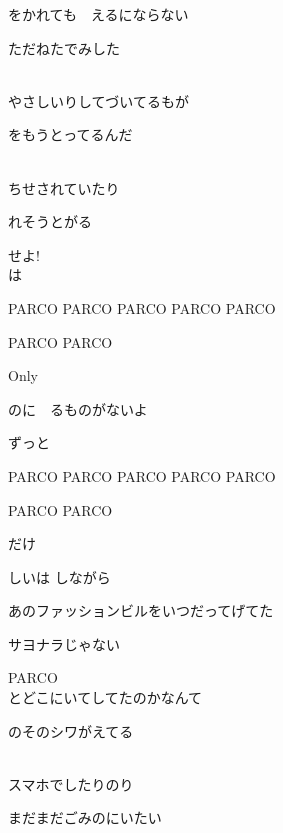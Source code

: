 をかれても　えるにならない

ただねたでみした

\\

やさしいりしてづいてるもが

をもうとってるんだ

\\

ちせされていたり

れそうとがる

せよ!
\\

は

PARCO PARCO PARCO PARCO PARCO

PARCO PARCO

Only

のに　るものがないよ

ずっと

PARCO PARCO PARCO PARCO PARCO

PARCO PARCO

だけ

しいは しながら

あのファッションビルをいつだってげてた

サヨナラじゃない

PARCO
\\

とどこにいてしてたのかなんて

のそのシワがえてる

\\

スマホでしたりのり

まだまだごみのにいたい

\\

